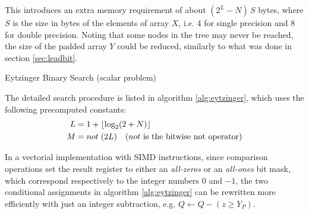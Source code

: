 \documentclass[preprint,1p,times]{elsarticle}
\begin{document}
This introduces an extra memory requirement of about $(2^L-N)\,S$ bytes, where $S$ is the size in bytes of the elements of array $X$, i.e. 4 for single precision and 8 for double precision. Noting that some nodes in the tree may never be reached, the size of the padded array $Y$ could be reduced, similarly to what was done in section \ref{sec:leadbit}.

\begin{algorithm}[ht]
	\caption{Eytzinger Binary Search (scalar problem)}
	\label{alg:eytzinger}
	\begin{algorithmic}
		  
		\EndIf
		  
		\EndIf
		\EndWhile
		
		 
		
		\EndFunction
	\end{algorithmic}
\end{algorithm}

The detailed search procedure is listed in algorithm \ref{alg:eytzinger}, which uses the following precomputed constants:
\begin{align*}
	L&=1+\left \lfloor \log_2(2+N) \right \rfloor \\
	M&= not \; (2L) \quad (not \text{ is the bitwise not operator})
\end{align*}

In a vectorial implementation with SIMD instructions, since comparison operations set the result register to either an \textit{all-zeros} or an \textit{all-ones} bit mask, which correspond respectively to the integer numbers $0$ and $-1$, the two conditional assignments in algorithm \ref{alg:eytzinger} can be rewritten more efficiently with just an integer subtraction, e.g. $Q \leftarrow Q - (z \geq Y_P)$.

\end{document}
